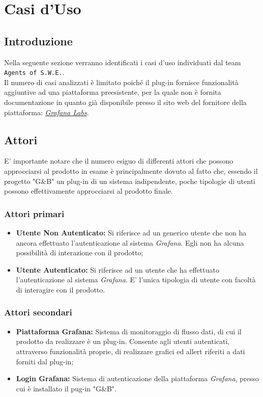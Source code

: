\section{Casi d'Uso}\label{CasiUso}
\subsection{Introduzione}\label{CasiUso_Introduzione}
Nella seguente sezione verranno identificati i casi d'uso individuati dal team \texttt{Agents of S.W.E.}.\\
Il numero di casi analizzati è limitato poiché il plug-in fornisce funzionalità aggiuntive ad una piattaforma preesistente, per la quale non è fornita documentazione in quanto già disponibile presso il sito web del fornitore della piattaforma: \href{http://docs.grafana.org/}{\textit{Grafana Labs}}.

\subsection{Attori}\label{Attori}
E' importante notare che il numero esiguo di differenti attori che possono approcciarsi al prodotto in esame è principalmente dovuto al fatto che, essendo il progetto "G\&B" un plug-in di un sistema indipendente, poche tipologie di utenti possono effettivamente approcciarsi al prodotto finale.

\subsubsection*{Attori primari}
\begin{itemize}
\item \textbf{Utente Non Autenticato:} Si riferisce ad un generico utente che non ha ancora effettuato l'autenticazione al sistema \textit{Grafana}\glossario. Egli non ha alcuna possibilità di interazione con il prodotto;
\item \textbf{Utente Autenticato:} Si riferisce ad un utente che ha effettuato l'autenticazione al sistema \textit{Grafana}. E' l'unica tipologia di utente con facoltà di interagire con il prodotto.
\end{itemize}

\subsubsection*{Attori secondari}
\begin{itemize}
\item \textbf{Piattaforma Grafana:} Sistema di monitoraggio di flusso dati, di cui il prodotto da realizzare è un plug-in. Consente agli utenti autenticati, attraverso funzionalità proprie, di realizzare grafici ed allert riferiti a dati forniti dal plug-in;
\item \textbf{Login Grafana:} Sistema di autenticazione della piattaforma \textit{Grafana}, presso cui è installato il pug-in "G\&B".
\end{itemize}


